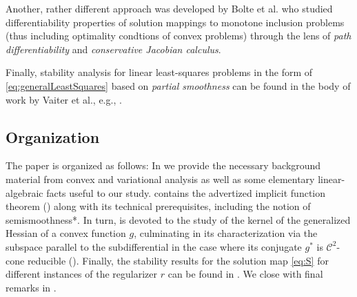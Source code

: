\documentclass[reqno]{amsart}
\numberwithin{equation}{section}
\begin{document}
Another, rather different approach was developed by Bolte et al. \cite{BLPS 21, BPS 24}  who studied differentiability properties of solution mappings to  monotone inclusion problems (thus including optimality condtions of convex problems) through the lens of  {\em path differentiability} and {\em conservative Jacobian calculus}.  

Finally, stability analysis for linear least-squares problems  in the form of \eqref{eq:generalLeastSquares} based on {\em partial smoothness} can be found in the body of work by Vaiter et al., e.g., \cite{VDF 15, VDF 17}.








\subsection{Organization} The paper is organized as follows: In  we provide the necessary background material from convex and variational analysis as well as some elementary linear-algebraic facts useful to our study. 
 contains the advertized implicit function theorem () along with its  technical prerequisites, including the notion of semismoothness*. In turn,  is devoted to the study of the kernel of the generalized Hessian of a convex function $g$, culminating in its characterization via the subspace parallel to the subdifferential in the case where its conjugate $g^*$ is $\mathcal{C}^2$-cone reducible (). Finally,  the stability results for the solution map \eqref{eq:S} for different instances of the regularizer $r$ can be found in . We close with final remarks in .


\medskip
\end{document}
